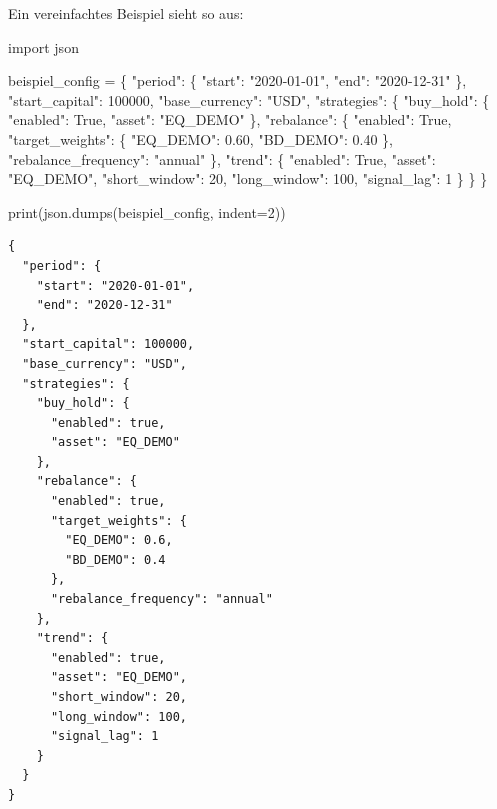 \documentclass[
  ngerman,
  a4paper,
  DIV=11,
  oneside]{scrreprt}
\newenvironment{Shaded}{\begin{snugshade}}{\end{snugshade}}
\newcommand{\BuiltInTok}[1]{\textcolor[rgb]{0.00,0.23,0.31}{#1}}
\newcommand{\DecValTok}[1]{\textcolor[rgb]{0.68,0.00,0.00}{#1}}
\newcommand{\FloatTok}[1]{\textcolor[rgb]{0.68,0.00,0.00}{#1}}
\newcommand{\ImportTok}[1]{\textcolor[rgb]{0.00,0.46,0.62}{#1}}
\newcommand{\NormalTok}[1]{\textcolor[rgb]{0.00,0.23,0.31}{#1}}
\newcommand{\OperatorTok}[1]{\textcolor[rgb]{0.37,0.37,0.37}{#1}}
\newcommand{\StringTok}[1]{\textcolor[rgb]{0.13,0.47,0.30}{#1}}
\newcommand{\VariableTok}[1]{\textcolor[rgb]{0.07,0.07,0.07}{#1}}
\begin{document}
Ein vereinfachtes Beispiel sieht so aus:

\begin{Shaded}
\begin{Highlighting}[]
\ImportTok{import}\NormalTok{ json}

\NormalTok{beispiel\_config }\OperatorTok{=}\NormalTok{ \{}
    \StringTok{"period"}\NormalTok{: \{}
        \StringTok{"start"}\NormalTok{: }\StringTok{"2020{-}01{-}01"}\NormalTok{,}
        \StringTok{"end"}\NormalTok{: }\StringTok{"2020{-}12{-}31"}
\NormalTok{    \},}
    \StringTok{"start\_capital"}\NormalTok{: }\DecValTok{100000}\NormalTok{,}
    \StringTok{"base\_currency"}\NormalTok{: }\StringTok{"USD"}\NormalTok{,}
    \StringTok{"strategies"}\NormalTok{: \{}
        \StringTok{"buy\_hold"}\NormalTok{: \{}
            \StringTok{"enabled"}\NormalTok{: }\VariableTok{True}\NormalTok{,}
            \StringTok{"asset"}\NormalTok{: }\StringTok{"EQ\_DEMO"}
\NormalTok{        \},}
        \StringTok{"rebalance"}\NormalTok{: \{}
            \StringTok{"enabled"}\NormalTok{: }\VariableTok{True}\NormalTok{,}
            \StringTok{"target\_weights"}\NormalTok{: \{}
                \StringTok{"EQ\_DEMO"}\NormalTok{: }\FloatTok{0.60}\NormalTok{,}
                \StringTok{"BD\_DEMO"}\NormalTok{: }\FloatTok{0.40}
\NormalTok{            \},}
            \StringTok{"rebalance\_frequency"}\NormalTok{: }\StringTok{"annual"}
\NormalTok{        \},}
        \StringTok{"trend"}\NormalTok{: \{}
            \StringTok{"enabled"}\NormalTok{: }\VariableTok{True}\NormalTok{,}
            \StringTok{"asset"}\NormalTok{: }\StringTok{"EQ\_DEMO"}\NormalTok{,}
            \StringTok{"short\_window"}\NormalTok{: }\DecValTok{20}\NormalTok{,}
            \StringTok{"long\_window"}\NormalTok{: }\DecValTok{100}\NormalTok{,}
            \StringTok{"signal\_lag"}\NormalTok{: }\DecValTok{1}
\NormalTok{        \}}
\NormalTok{    \}}
\NormalTok{\}}

\BuiltInTok{print}\NormalTok{(json.dumps(beispiel\_config, indent}\OperatorTok{=}\DecValTok{2}\NormalTok{))}
\end{Highlighting}
\end{Shaded}

\begin{verbatim}
{
  "period": {
    "start": "2020-01-01",
    "end": "2020-12-31"
  },
  "start_capital": 100000,
  "base_currency": "USD",
  "strategies": {
    "buy_hold": {
      "enabled": true,
      "asset": "EQ_DEMO"
    },
    "rebalance": {
      "enabled": true,
      "target_weights": {
        "EQ_DEMO": 0.6,
        "BD_DEMO": 0.4
      },
      "rebalance_frequency": "annual"
    },
    "trend": {
      "enabled": true,
      "asset": "EQ_DEMO",
      "short_window": 20,
      "long_window": 100,
      "signal_lag": 1
    }
  }
}
\end{verbatim}
\end{document}
